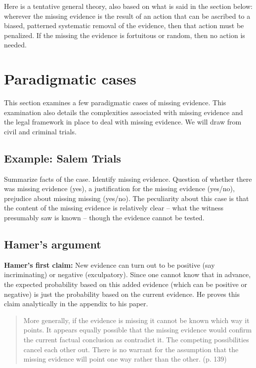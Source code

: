 \documentclass[
  10pt,
  dvipsnames,enabledeprecatedfontcommands]{scrartcl}
\begin{document}
Here is a tentative general theory, also based on what is said in the
section below: wherever the missing evidence is the result of an action
that can be ascribed to a biased, patterned systematic removal of the
evidence, then that action must be penalized. If the missing the
evidence is fortuitous or random, then no action is needed.

\hypertarget{paradigmatic-cases}{%
\section{Paradigmatic cases}\label{paradigmatic-cases}}

This section examines a few paradigmatic cases of missing evidence. This
examination also details the complexities associated with missing
evidence and the legal framework in place to deal with missing evidence.
We will draw from civil and criminal trials.

\hypertarget{example-salem-trials}{%
\subsection{Example: Salem Trials}\label{example-salem-trials}}

Summarize facts of the case. Identify missing evidence. Question of
whether there was missing evidence (yes), a justification for the
missing evidence (yes/no), prejudice about missing missing (yes/no). The
peculiarity about this case is that the content of the missing evidence
is relatively clear -- what the witness presumably saw is known --
though the evidence cannot be tested.

\hypertarget{hamers-argument}{%
\subsection{Hamer's argument}\label{hamers-argument}}

\textbf{Hamer's first claim:} New evidence can turn out to be positive
(say incriminating) or negative (exculpatory). Since one cannot know
that in advance, the expected probability based on this added evidence
(which can be positive or negative) is just the probability based on the
current evidence. He proves this claim analytically in the appendix to
his paper.

\begin{quote}
More generally, if the evidence is missing it cannot be known which way it points.
It appears equally possible that the missing evidence would confirm the current factual conclusion as
contradict it. The competing possibilities cancel each other out. There is no warrant for the assumption
that the missing evidence will point one way rather than the other. (p. 139)
\end{quote}
\end{document}
